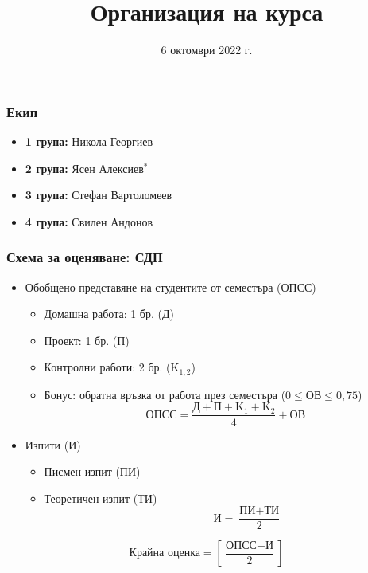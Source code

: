 \documentclass{beamer}
\title{Организация на курса}
\date{6 октомври 2022 г.}
\begin{document}
\begin{frame}
  \titlepage
\end{frame}

\begin{frame}
  \frametitle{Екип}

  \begin{itemize}
  \item \textbf{1 група:} Никола Георгиев
  \item \textbf{2 група:} Ясен Алексиев{\tiny$^*$}
  \item \textbf{3 група:} Стефан Вартоломеев
  \item \textbf{4 група:} Свилен Андонов
  \end{itemize}
\end{frame}

\begin{frame}
  \frametitle{Схема за оценяване: СДП}

  \begin{itemize}
  \item Обобщено представяне на студентите от семестъра (ОПСС)
    \begin{itemize}
    \item Домашна работа: 1 бр. (Д)
    \item Проект: 1 бр. (П)
    \item Контролни работи: 2 бр. (K$_{1,2}$)
    \item Бонус: обратна връзка от работа през семестъра ($0 \leq \text{ОВ} \leq 0{,}75$)\\
      \begin{equation*}
        \text{ОПСС} = \frac{\text{Д} + \text{П} + \text{K}_1 + \text{K}_2}4 + \text{ОВ}
      \end{equation*}
    \end{itemize}
  \item Изпити (И)
    \begin{itemize}
    \item Писмен изпит (ПИ)
    \item Теоретичен изпит (ТИ)\\[-7.5ex]
      \begin{equation*}
        \qquad\qquad\text{И} = \frac{\text{ПИ} + \text{ТИ}}2
      \end{equation*}
    \end{itemize}
  \end{itemize}
  \vspace{2ex}
  \begin{equation*}
    \text{Крайна оценка} = \left[ \frac{\text{ОПСС} + \text{И}}2 \right]
  \end{equation*}
\end{frame}
\end{document}

